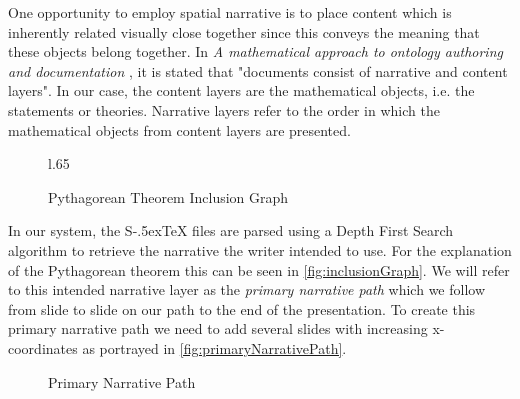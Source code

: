 \documentclass{llncs}
\def\stex{\texorpdfstring{\raisebox{-.5ex}S\kern-.5ex\TeX}{sTeX}\xspace}
\begin{document}
One opportunity to employ spatial narrative is to place content which is inherently related visually close together since this conveys the meaning that these objects belong together. In \textit{A mathematical approach to ontology authoring and documentation} \cite{LK:MathOntoAuthDoc09}, it is stated that "documents consist of narrative and content layers". In our case, the content layers are the mathematical objects, i.e. the statements or theories. Narrative layers refer to the order in which the mathematical objects from content layers are presented.

\begin{figure}l{.65\textwidth}\vspace{-2em}
  \vspace{-1.8em}
  \caption{Pythagorean Theorem Inclusion Graph}\label{fig:inclusionGraph}
  \vspace{-2em}
\end{figure}

In our system, the \stex files are parsed using a Depth First Search algorithm to retrieve the narrative the writer intended to use. For the explanation of the Pytha\-go\-rean theorem this can be seen in \autoref{fig:inclusionGraph}. We will refer to this intended narrative layer as the \textit{primary narrative path} which we follow from slide to slide on our path to the end of the presentation. To create this primary narrative path we need to add several slides with increasing x-coordinates as portrayed in \autoref{fig:primaryNarrativePath}.

\begin{figure}[ht]\centering
  \vspace{-.5em}
  \caption{Primary Narrative Path}\label{fig:primaryNarrativePath}
  \vspace{-1em}
\end{figure}
\end{document}
